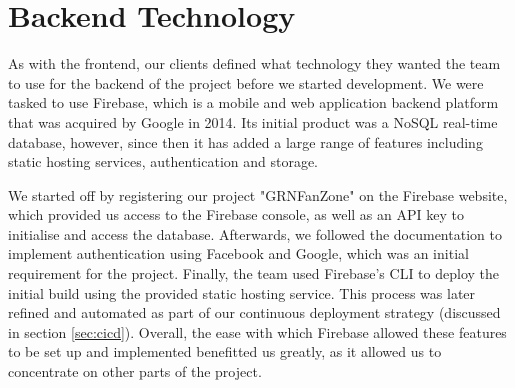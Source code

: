 \documentclass{l3proj}
\begin{document}


\section{Backend Technology} %
\label{sec:backend}

As with the frontend, our clients defined what technology they wanted the team
 to use for the backend of the project before we started development. We were
 tasked to use Firebase, which is a mobile and web application backend platform that
 was acquired by Google in 2014. Its initial product was a NoSQL real-time database,
 however, since then it has added a large range of features including static
 hosting services, authentication and storage.

We started off by registering our project "GRNFanZone" on the Firebase website,
 which provided us access to the Firebase console, as well as an API key to
 initialise and access the database. Afterwards, we followed the documentation
 to implement authentication using Facebook and Google, which was an initial
 requirement for the project. Finally, the team used Firebase's CLI to deploy
 the initial build using the provided static hosting service. This process
 was later refined and automated as part of our continuous deployment strategy
 (discussed in section \ref{sec:cicd}). Overall, the ease with which Firebase
 allowed these features to be set up and implemented benefitted us greatly,
 as it allowed us to concentrate on other parts of the project.
\end{document}
